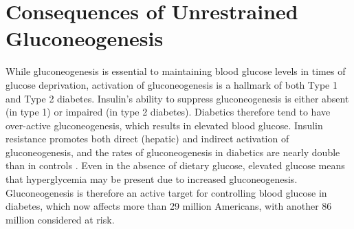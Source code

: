 \documentclass{tufte-handout}
\begin{document}
\section{Consequences of Unrestrained Gluconeogenesis}

While gluconeogenesis is essential to maintaining blood glucose levels in times of glucose deprivation, activation of gluconeogenesis is a hallmark of both Type 1 and Type 2 diabetes.  Insulin's ability to suppress gluconeogenesis is either absent (in type 1) or impaired (in type 2 diabetes).  Diabetics therefore tend to have over-active gluconeogenesis, which results in elevated blood glucose.  Insulin resistance promotes both direct (hepatic) and indirect activation of gluconeogenesis, and the rates of gluconeogenesis in diabetics are nearly double than in controls \citep{Magnusson1992}.  Even in the absence of dietary glucose, elevated glucose means that hyperglycemia may be present due to increased gluconeogenesis.  Gluconeogenesis is therefore an active target for controlling blood glucose in diabetes, which now affects more than 29 million Americans, with another 86 million considered at risk\cite{CentersforDiseaseControl2016}.






\end{document}
